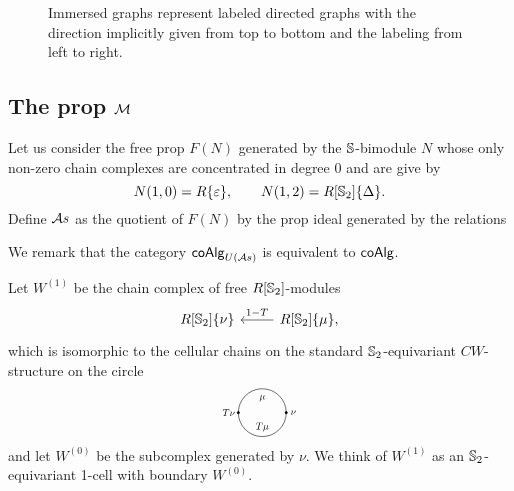 \begin{figure}
	
	\caption{Immersed graphs represent labeled directed graphs with the direction implicitly given from top to bottom and the labeling from left to right.}
	\label{f:immersion}
\end{figure}

\subsection{The prop $\M$}

Let us consider the free prop $F(N)$ generated by the $\S$-bimodule $N$ whose only non-zero chain complexes are concentrated in degree $0$ and are give by
\begin{equation*}
N(1, 0) = R\{\varepsilon\}, \qquad
N(1, 2) = R[\S_2]\{\Delta\}.
\end{equation*}
Define $\A$ as the quotient of $F(N)$ by the prop ideal generated by the relations

We remark that the category $\coAlg_{U(\A)}$ is equivalent to $\coAlg$.

Let $W^{(1)}$ be the chain complex of free $R[\S_2]$-modules
\begin{equation*}
\begin{tikzcd}
R[\S_2]\{\nu\} &[0pt] \arrow[l, "1-T"'] R[\S_2]\{\mu\},
\end{tikzcd} 
\end{equation*}
which is isomorphic to the cellular chains on the standard $\S_2$-equivariant $CW$-structure on the circle
\begin{equation*}
\begin{tikzpicture}[scale=.85]
\draw (0,0) circle (20pt);
\node[scale=.7] at (0,12pt){$\mu$};
\node[scale=.7] at (0,-12pt){$T \mu$};
\node[scale=.7] at (-28pt,0){$T \nu$};
\node[scale=.7] at (26pt,0){$\nu$};
\draw [fill] (-20pt,0) circle [radius=1pt];
\draw [fill] (20pt,0) circle [radius=1pt];
\end{tikzpicture}
\end{equation*}
and let $W^{(0)}$ be the subcomplex generated by $\nu$. We think of $W^{(1)}$ as an $\S_2$-equivariant 1-cell with boundary $W^{(0)}$.

